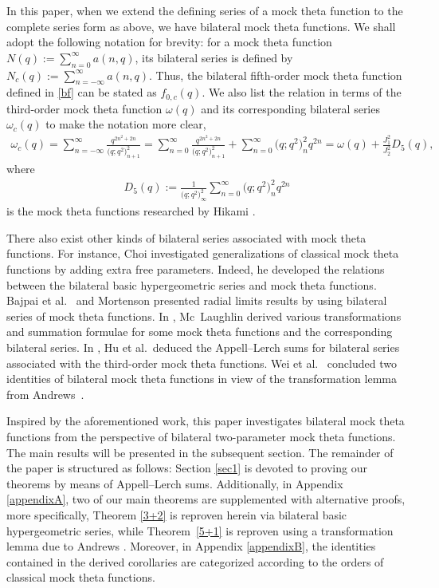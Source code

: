 \documentclass[pdftex]{sigma}
\numberwithin{equation}{section}
\begin{document}
In this paper, when we extend the defining series of a mock theta function to the complete series form as above, we have bilateral mock theta functions. We shall adopt the following notation for brevity: for a mock theta function
$N(q):=\sum_{n=0}^{\infty}a(n,q)$,
its bilateral series is defined by
$N_c(q):=\sum_{n=-\infty}^{\infty}a(n,q)$.
Thus, the bilateral fifth-order mock theta function defined in \eqref{bf} can be stated as $f_{0,c}(q)$.
 We also list the relation in terms of the third-order mock theta function $\omega(q)$ and its corresponding bilateral series $\omega_c(q)$ to make the notation more clear,
\begin{align}\label{0-1}
\omega_c(q)=\sum_{n=-\infty}^{\infty}\frac{q^{2n^2+2n}}{\bigl(q;q^2\bigr)_{n+1}^2}
=\sum_{n=0}^{\infty}\frac{q^{2n^2+2n}}{\bigl(q;q^2\bigr)_{n+1}^2}
+\sum_{n=0}^{\infty}\bigl(q;q^2\bigr)_n^2q^{2n}
=\omega(q)+\frac{J_1^2}{J_2^2}D_5(q),
\end{align}
where
\begin{align*}
D_5(q):=\frac{1}{\bigl(q;q^2\bigr)_{\infty}^2}\sum_{n=0}^{\infty}\bigl(q;q^2\bigr)_n^2q^{2n}
\end{align*}
is the mock theta functions researched by Hikami \cite{Hi}.

There also exist other kinds of bilateral series associated with mock theta functions. For instance, Choi \cite{Ch} investigated generalizations of classical mock theta functions by adding extra free parameters. Indeed, he developed the relations between the bilateral basic hypergeometric series and mock theta functions. Bajpai et al.\ \cite{BKLMR} and Mortenson \cite{Mo} presented radial limits results by using bilateral series of mock theta functions. In \cite{Mc}, Mc~Laughlin derived various transformations and summation formulae for some mock theta functions and the corresponding bilateral series. In \cite{HSZ}, Hu et al.\ deduced the Appell--Lerch sums for bilateral series associated with the third-order mock theta functions. Wei et al.\ \cite[Corollaries~2.1 and 2.2]{WYH} concluded two identities of bilateral mock theta functions in view of the transformation lemma from Andrews~\cite{A}.


Inspired by the aforementioned work, this paper investigates bilateral mock theta functions from the perspective of bilateral two-parameter mock theta functions. The main results will be presented in the subsequent section. The remainder of the paper is structured as follows: Section \ref{sec1} is devoted to proving our theorems by means of Appell--Lerch sums. Additionally, in Appendix \ref{appendixA}, two of our main theorems are supplemented with alternative proofs, more specifically, Theorem \ref{3+2} is reproven herein via bilateral basic hypergeometric series, while Theorem~\ref{5+1} is reproven using a transformation lemma due to Andrews \cite{A}. Moreover, in Appendix \ref{appendixB}, the identities contained in the derived corollaries are categorized according to the orders of classical mock theta functions.
\end{document}
